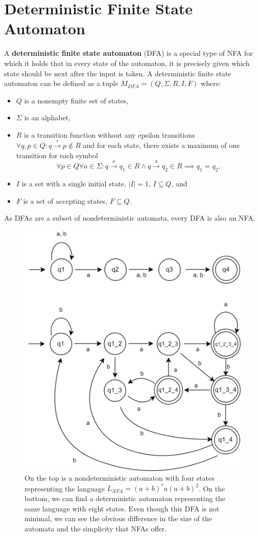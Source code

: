\section{Deterministic Finite State Automaton}
\label{sec:dfa}
A \textbf{deterministic finite state automaton} (DFA) is a special type of NFA for which it holds that in every state of the automaton, it is precisely given which state should be next after the input is taken. A deterministic finite state automaton can be defined as a tuple ${M_{DFA}=(Q,\Sigma, R, I, F)}$ where:
\begin{itemize}
    \item $Q$ is a nonempty finite set of states,
    \item $\Sigma$ is an alphabet,
    \item $R$ is a transition function without any epsilon transitions $\forall q, p \in Q: q \xrightarrow{\varepsilon} p \notin R$ and for each state, there exists a maximum of one transition for each symbol
    \begin{equation*}
        \forall p \in Q \forall a \in \Sigma: q \xrightarrow{a} q_1 \in R \land  q \xrightarrow{a} q_2 \in R \implies q_1 = q_2,
    \end{equation*}
    \item $I$ is a set with a single initial state, $|I| = 1$, $I \subseteq Q$, and
    \item $F$ is a set of accepting states, $F \subseteq Q$.
\end{itemize}

As DFAs are a subset of nondeterministic automata, every DFA is also an NFA.

\begin{figure}[ht]
    \label{NFA to DFA}
    \centering
    \includegraphics[width=0.6\linewidth]{obrazky-figures/NFA to DFA.drawio.png}
    \caption{On the top is a nondeterministic automaton with four states representing the language $L_{NFA}=(a+b)^*a(a+b)^2$. On the bottom, we can find a deterministic automaton representing the same language with eight states. Even though this DFA is not minimal, we can see the obvious difference in the size of the automata and the simplicity that NFAs offer.}
\end{figure}
\vspace{0.3cm}

